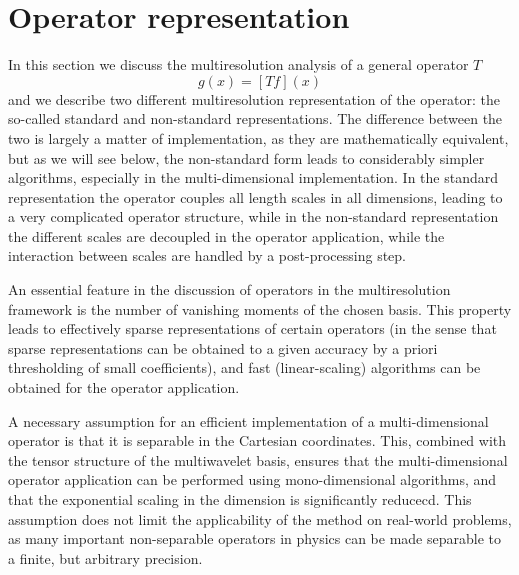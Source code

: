 \section{Operator representation}\label{sec:operator}
In this section we discuss the multiresolution analysis of a general operator $T$
\begin{equation}
    g(x) = [Tf](x)
\end{equation}
and we describe two different multiresolution representation of the operator: the 
so-called standard and non-standard representations. The difference between 
the two is largely a matter of implementation, as they are mathematically equivalent,
but as we will see below, the non-standard form leads to considerably simpler algorithms, 
especially in the multi-dimensional implementation. In the standard representation the
operator couples all length scales in all dimensions, leading to a very complicated
operator structure, while in the non-standard representation the different scales are 
decoupled in the operator application, while the interaction between scales are handled 
by a post-processing step.

An essential feature in the discussion of operators in the multiresolution framework
is the number of vanishing moments of the chosen basis. This property leads to 
effectively sparse representations of certain operators (in the sense that sparse
representations can be obtained to a given accuracy by a priori thresholding of small 
coefficients), and fast (linear-scaling) algorithms can be obtained for the operator 
application.

A necessary assumption for an efficient implementation of a multi-dimensional operator
is that it is separable in the Cartesian coordinates. This, combined with the tensor
structure of the multiwavelet basis, ensures that the multi-dimensional operator 
application can be performed using mono-dimensional algorithms, and that the exponential
scaling in the dimension is significantly reducecd. This assumption does not
limit the applicability of the method on real-world problems, as many important 
non-separable operators in physics can be made separable to a finite, but arbitrary
precision.


